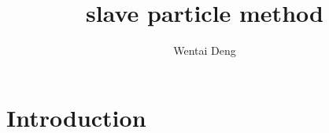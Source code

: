 \documentclass{article}
\title{slave particle method}
\author{Wentai Deng}
\begin{document}
\maketitle
\section{Introduction}
\end{document}
